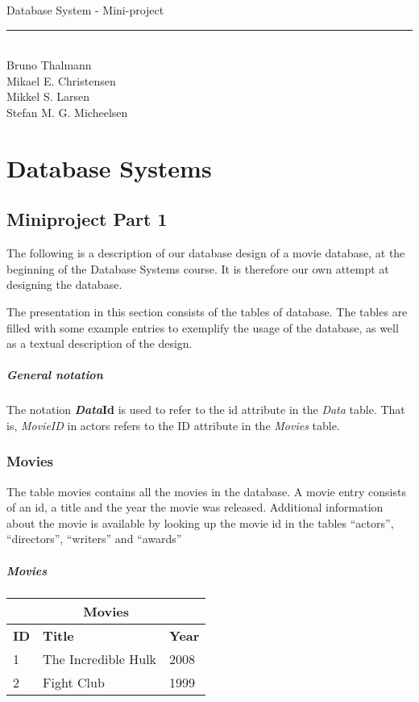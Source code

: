 
\newcommand{\HRule}{\rule{\linewidth}{0.5mm}}


\begin{titlepage}
\centering
{\LARGE Database System - Mini-project}
\HRule \\[0.5cm]
Bruno Thalmann\\
			Mikael E. Christensen\\
			Mikkel S. Larsen\\
			Stefan M. G. Micheelsen
\end{titlepage}

\chapter*{Database Systems}

\section{Miniproject Part 1}
The following is a description of our database design of a movie database, at the beginning of the Database Systems course.
It is therefore our own attempt at designing the database.

The presentation in this section consists of the tables of database.
The tables are filled with some example entries to exemplify the usage of the database, as well as a textual description of the design.

\paragraph{General notation}
The notation \textbf{\textit{Data}Id} is used to refer to the id attribute in the \textit{Data} table.
That is, \textit{MovieID} in actors refers to the ID attribute in the \textit{Movies} table.

\subsection{Movies}
The table movies contains all the movies in the database. 
A movie entry consists of an id, a title and the year the movie was released.
Additional information about the movie is available by looking up the movie id in the tables ``actors'', ``directors'', ``writers'' and ``awards''

\paragraph{Movies}
\begin{center}
\begin{tabular}{|l|l|l|}
\hline
\multicolumn{3}{|c|}{Movies} \\ \hline \hline
\textbf{ID} & \textbf{Title} & \textbf{Year} \\ \hline \hline
1 & The Incredible Hulk & 2008 \\ \hline
2 & Fight Club & 1999 \\ \hline
\end{tabular}
\end{center}

